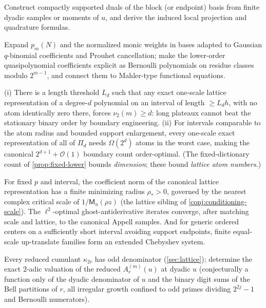 \documentclass[11pt,oneside]{article}
\numberwithin{equation}{section}
\theoremstyle{definition}
\theoremstyle{remark}
\newcommand{\bigO}{\mathcal O}
\newcommand{\vtwo}{\nu_2}
\newcommand{\MM}{\mathsf M}
\newcommand{\PiD}{\Pi_d}
\begin{document}
\begin{problem}
\label{prob:duals}
Construct compactly supported duals of the block (or endpoint) basis
from finite dyadic samples or moments of $u$, and derive the induced
local projection and quadrature formulas.
\end{problem}

\begin{problem}
\label{prob:weight-arithmetic}
Expand $p_m(N)$ and the normalized monic weights in bases adapted to
Gaussian $q$-binomial coefficients and Prouhet cancellation; make the
lower-order quasipolynomial coefficients explicit as Bernoulli
polynomials on residue classes modulo $2^{m-1}$, and connect them to
Mahler-type functional equations.
\end{problem}

\begin{conjecture}
\label{conj:lattice-minimality}
(i) There is a length threshold $L_d$ such that any exact one-scale
lattice representation of a degree-$d$ polynomial on an interval of
length $\ge L_dh$, with no atom identically zero there, forces
$\vtwo(m)\ge d$: long plateaux cannot beat the stationary binary
order by boundary engineering.  (ii) For intervals comparable to the
atom radius and bounded support enlargement, every one-scale exact
representation of all of $\PiD$ needs $\Omega(2^{d})$ atoms in the
worst case, making the canonical $2^{d+1}+\bigO(1)$ boundary count
order-optimal.  (The fixed-dictionary count of
\cref{prop:fixed-lower} bounds \emph{dimension}; these bound
\emph{lattice atom numbers}.)
\end{conjecture}

\begin{conjecture}
\label{conj:lattice-analytic}
For fixed $p$ and interval, the coefficient norm of the canonical
lattice representation has a finite minimizing radius $\rho_*>0$,
governed by the nearest complex critical scale of
$1/\MM_u(\rho z)$ (the lattice sibling of
\cref{conj:conditioning-scale}).  The $\ell^{2}$-optimal
ghost-antiderivative iterates converge, after matching scale and
lattice, to the canonical Appell samples.  And for generic ordered
centers on a sufficiently short interval avoiding support endpoints,
finite equal-scale up-translate families form an extended Chebyshev
system.
\end{conjecture}

\begin{question}
\label{q:odd-denominator}
Every reduced cumulant $\kappa_{2r}$ has odd denominator
(\cref{sec:lattice}); determine the exact $2$-adic valuation of the
reduced $A^{(m)}_r(u)$ at dyadic $u$ (conjecturally a function only
of the dyadic denominator of $u$ and the binary digit sums of the
Bell partitions of $r$, all irregular growth confined to odd primes
dividing $2^{2j}-1$ and Bernoulli numerators).
\end{question}
\end{document}
